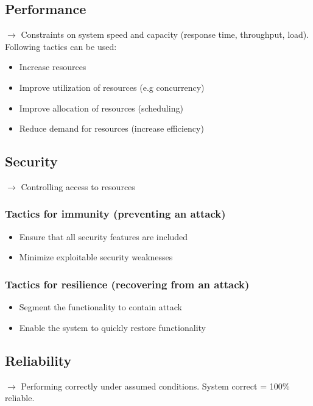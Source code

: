 \subsection{Performance}

$\rightarrow$ Constraints on system speed and capacity (response time, throughput, load).
Following tactics can be used:
\begin{itemize}
	\item Increase resources
	\item Improve utilization of resources (e.g concurrency)
	\item Improve allocation of resources (scheduling)
	\item Reduce demand for resources (increase efficiency)
\end{itemize}


\subsection{Security}
$\rightarrow$ Controlling access to resources 
\subsubsection{Tactics for immunity (preventing an attack)}

\begin{itemize}
    \item Ensure that all security features are included
    \item Minimize exploitable security weaknesses
\end{itemize}

\subsubsection{Tactics for resilience (recovering from an attack)}

\begin{itemize}
    \item Segment the functionality to contain attack
    \item Enable the system to quickly restore functionality
\end{itemize}

\subsection{Reliability}

$\rightarrow$ Performing correctly under assumed conditions. System correct = 100\% reliable.

